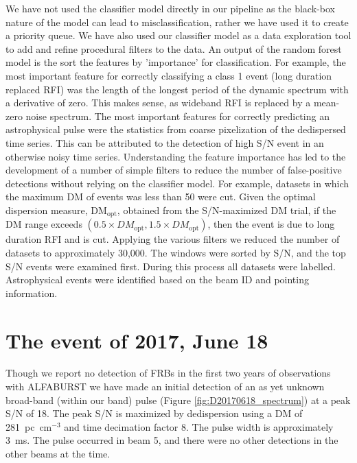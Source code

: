 \documentclass[a4paper,fleqn,usenatbib]{mnras}
\begin{document}
We have not used the classifier model directly in our pipeline as the black-box
nature of the model can lead to misclassification, rather we have used it to
create a priority queue.  We have also used our classifier model as a data
exploration tool to add and refine procedural filters to the data.  An output of
the random forest model is the sort the features by 'importance' for
classification. For example, the most important feature for correctly
classifying a class 1 event (long duration replaced RFI) was the length of the
longest period of the dynamic spectrum with a derivative of zero. This makes
sense, as wideband RFI is replaced by a mean-zero noise spectrum. The most
important features for correctly predicting an astrophysical pulse were the
statistics from coarse pixelization of the dedispersed time series. This can be
attributed to the detection of high S/N event in an otherwise noisy time series.
Understanding the feature importance has led to the development of a number of
simple filters to reduce the number of false-positive detections without relying
on the classifier model. For example, datasets in which the maximum DM of events
was less than 50 were cut.  Given the optimal dispersion measure,
DM$_{\textrm{opt}}$, obtained from the S/N-maximized DM trial,  if the DM range
exceeds $(0.5 \times DM_{\textrm{opt}}, 1.5 \times DM_{\textrm{opt}})$, then the
event is due to long duration RFI and is cut.  Applying the various filters we
reduced the number of datasets to approximately 30,000. The windows were sorted
by S/N, and the top S/N events were examined first.  During this process all
datasets were labelled.  Astrophysical events were identified based on the beam
ID and pointing information.



\section{The event of 2017, June 18}
\label{sec:18062017}

Though we report no detection of FRBs in the first two years of observations
with ALFABURST we have made an initial detection of an as yet unknown broad-band
(within our band) pulse (Figure \ref{fig:D20170618_spectrum}) at a peak S/N of
18. The peak S/N is maximized by dedispersion using a DM of 281~pc~cm$^{-3}$ and
time decimation factor 8. The pulse width is approximately 3~ms. The pulse
occurred in beam 5, and there were no other detections in the other beams at the
time.
\end{document}
